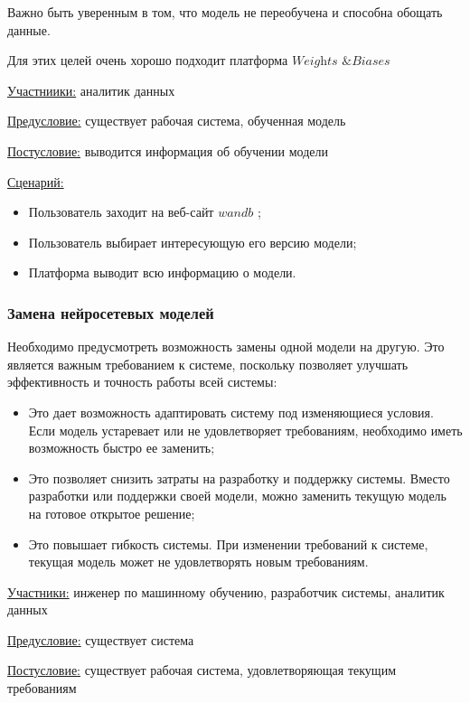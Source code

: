 Важно быть уверенным в том, что модель не переобучена и способна обощать данные.

Для этих целей очень хорошо подходит платформа $\textit{Weights \& Biases}$ \cite{wandb}

\underline{Участниики:} аналитик данных

\underline{Предусловие:} существует рабочая система, обученная модель

\underline{Постусловие:} выводится информация об обучении модели

\underline{Сценарий:}

\begin{itemize}
    \item Пользователь заходит на веб-сайт $wandb$ \cite{wandb};
    \item Пользователь выбирает интересующую его версию модели; 
    \item Платформа выводит всю информацию о модели.
\end{itemize}

\subsubsection{Замена нейросетевых моделей}

Необходимо предусмотреть возможность замены одной модели на другую. Это является важным требованием к системе, поскольку позволяет улучшать эффективность и точность работы всей системы:
\begin{itemize}
    \item Это дает возможность адаптировать систему под изменяющиеся условия. Если модель устаревает или не удовлетворяет требованиям, необходимо иметь возможность быстро ее заменить;
    \item Это позволяет снизить затраты на разработку и поддержку системы. Вместо разработки или поддержки своей модели, можно заменить текущую модель на готовое открытое решение;
    \item Это повышает гибкость системы. При изменении требований к системе, текущая модель может не удовлетворять новым требованиям.
\end{itemize}

\underline{Участники:} инженер по машинному обучению, разработчик системы, аналитик данных

\underline{Предусловие:} существует система

\underline{Постусловие:} существует рабочая система, удовлетворяющая текущим требованиям

